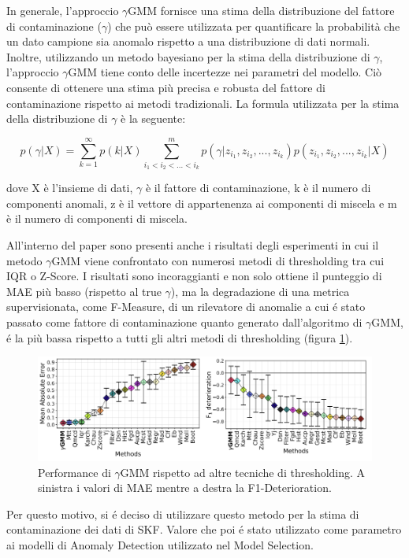 In generale, l'approccio $\gamma$GMM fornisce una stima della distribuzione del fattore di contaminazione ($\gamma$) che può essere utilizzata per quantificare la probabilità che un dato campione sia anomalo rispetto a una distribuzione di dati normali. Inoltre, utilizzando un metodo bayesiano per la stima della distribuzione di $\gamma$, l'approccio $\gamma$GMM tiene conto delle incertezze nei parametri del modello. Ciò consente di ottenere una stima più precisa e robusta del fattore di contaminazione rispetto ai metodi tradizionali.
La formula utilizzata per la stima della distribuzione di $\gamma$ è la seguente:

\[p(\gamma | X) = \sum_{k=1}^{\infty} p(k | X) \sum_{i_1 < i_2 <...< i_k}^{m} p(\gamma | z_{i_1}, z_{i_2},..., z_{i_k}) p(z_{i_1}, z_{i_2},..., z_{i_k} | X)\]

dove X è l'insieme di dati, $\gamma$ è il fattore di contaminazione, k è il numero di componenti anomali, z è il vettore di appartenenza ai componenti di miscela e m è il numero di componenti di miscela.

All'interno del paper sono presenti anche i risultati degli esperimenti in cui il metodo $\gamma$GMM viene confrontato con numerosi metodi di thresholding tra cui IQR o Z-Score. I risultati sono incoraggianti e non solo ottiene il punteggio di MAE più basso (rispetto al true $\gamma$), ma la degradazione di una metrica supervisionata, come F-Measure, di un rilevatore di anomalie a cui é stato passato come fattore di contaminazione quanto generato dall'algoritmo di $\gamma$GMM, é la più bassa rispetto a tutti gli altri metodi di thresholding (figura \ref{ygmm2}). 

\begin{figure}[t]
	\centering
	\includegraphics[width=14cm, scale=1]{images/ygmm2}
	\caption{Performance di $\gamma$GMM rispetto ad altre tecniche di thresholding. A sinistra i valori di MAE mentre a destra la F1-Deterioration.}
	\label{ygmm2}
\end{figure}

Per questo motivo, si é deciso di utilizzare questo metodo per la stima di contaminazione dei dati di SKF. Valore che poi é stato utilizzato come parametro ai modelli di Anomaly Detection utilizzato nel Model Selection.

